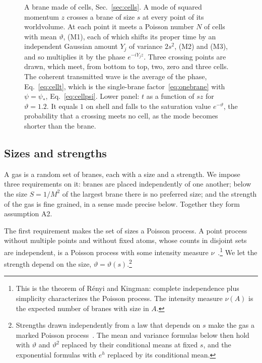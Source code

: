 \documentclass[aps,prd,10pt,twocolumn,superscriptaddress,nofootinbib,floatfix,longbibliography]{revtex4-2}
\begin{document}
\begin{figure}[t]
\caption{A brane made of cells, Sec.~\ref{sec:cells}. A mode of squared momentum $z$ crosses a brane of size $s$ at every point of its worldvolume. At each point it meets a Poisson number $N$ of cells with mean $\vartheta$, (M1), each of which shifts its proper time by an independent Gaussian amount $Y_j$ of variance $2s^2$, (M2) and (M3), and so multiplies it by the phase $e^{-iY_jz}$. Three crossing points are drawn, which meet, from bottom to top, two, zero and three cells. The coherent transmitted wave is the average of the phase, Eq.~\eqref{eq:cellt}, which is the single-brane factor~\eqref{eq:onebrane} with $\psi=\psi_*$, Eq.~\eqref{eq:cellpsi}. Lower panel: $t$ as a function of $sz$ for $\vartheta=1.2$. It equals $1$ on shell and falls to the saturation value $e^{-\vartheta}$, the probability that a crossing meets no cell, as the mode becomes shorter than the brane.}
\label{fig:cells}
\end{figure}

\subsection{Sizes and strengths}
\label{sec:sizes}

A gas is a random set of branes, each with a size and a strength. We impose three requirements on it: branes are placed independently of one another; below the size $S=1/M^2$ of the largest brane there is no preferred size; and the strength of the gas is fine grained, in a sense made precise below. Together they form assumption A2.

The first requirement makes the set of sizes a Poisson process. A point process without multiple points and without fixed atoms, whose counts in disjoint sets are independent, is a Poisson process with some intensity measure $\nu$~\cite{Kingman1993,LastPenrose2017}.\footnote{This is the theorem of R\'enyi and Kingman: complete independence plus simplicity characterizes the Poisson process. The intensity measure $\nu(A)$ is the expected number of branes with size in $A$.} We let the strength depend on the size, $\vartheta=\vartheta(s)$.\footnote{Strengths drawn independently from a law that depends on $s$ make the gas a marked Poisson process~\cite{Kingman1993}. The mean and variance formulas below then hold with $\vartheta$ and $\vartheta^2$ replaced by their conditional means at fixed $s$, and the exponential formulas with $e^{h}$ replaced by its conditional mean.}
\end{document}
